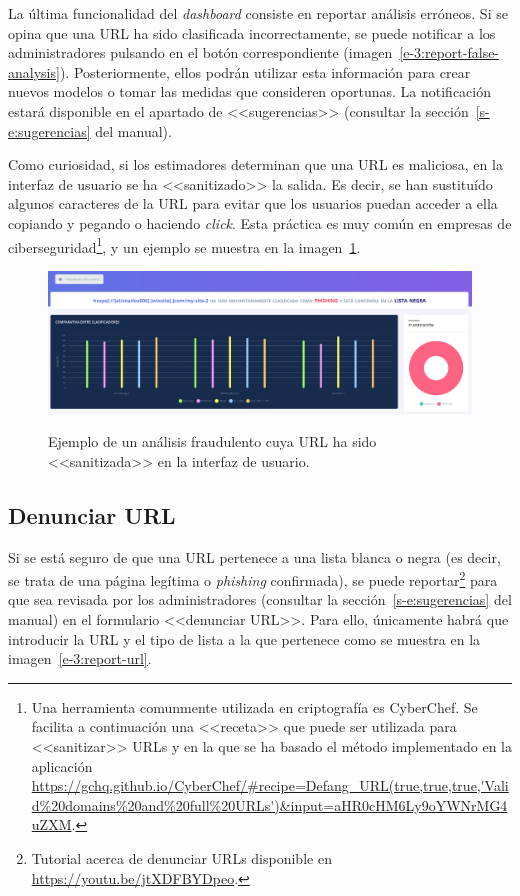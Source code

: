 \label{s-e:report-false-analy}
La última funcionalidad del \textit{dashboard} consiste en reportar análisis erróneos. Si se opina que una URL ha sido clasificada incorrectamente, se puede notificar a los administradores pulsando en el botón correspondiente (imagen~\ref{e-3:report-false-analysis}). Posteriormente, ellos podrán utilizar esta información para crear nuevos modelos o tomar las medidas que consideren oportunas. La notificación estará disponible en el apartado de <<sugerencias>> (consultar la sección~\ref{s-e:sugerencias} del manual).

Como curiosidad, si los estimadores determinan que una URL es maliciosa, en la interfaz de usuario se ha <<sanitizado>> la salida. Es decir, se han sustituído algunos caracteres de la URL para evitar que los usuarios puedan acceder a ella copiando y pegando o haciendo \textit{click}. Esta práctica es muy común en empresas de ciberseguridad\footnote{Una herramienta comunmente utilizada en criptografía es CyberChef. Se facilita a continuación una <<receta>> que puede ser utilizada para <<sanitizar>> URLs y en la que se ha basado el método implementado en la aplicación \url{https://gchq.github.io/CyberChef/\#recipe=Defang_URL(true,true,true,'Valid\%20domains\%20and\%20full\%20URLs')\&input=aHR0cHM6Ly9oYWNrMG4uZXM}.}, y un ejemplo se muestra en la imagen~\ref{e-3:sanitize}.

\begin{figure}[h]
	\caption[Manual de usuario: URL fraudulenta <<sanitizada>>]{Ejemplo de un análisis fraudulento cuya URL ha sido <<sanitizada>> en la interfaz de usuario.}
	\centering
	\includegraphics[width=\textwidth]{../img/anexos/user_guide/3_dashboard_3}
	\label{e-3:sanitize}
\end{figure}

\subsection{Denunciar URL}
\label{s-e:report-url}

Si se está seguro de que una URL pertenece a una lista blanca o negra (es decir, se trata de una página legítima o \textit{phishing} confirmada), se puede reportar\footnote{Tutorial acerca de denunciar URLs disponible en \url{https://youtu.be/jtXDFBYDpeo}.} para que sea revisada por los administradores (consultar la sección~\ref{s-e:sugerencias} del manual) en el formulario <<denunciar URL>>. Para ello, únicamente habrá que introducir la URL y el tipo de lista a la que pertenece como se muestra en la imagen~\ref{e-3:report-url}.


